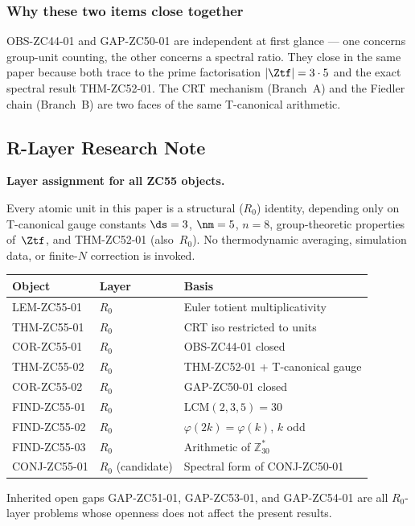 \documentclass[12pt, a4paper]{article}
\begin{document}
\subsubsection{Why these two items close together}

OBS-ZC44-01 and GAP-ZC50-01 are independent at first glance --- one
concerns group-unit counting, the other concerns a spectral ratio.
They close in the same paper because both trace to the prime
factorisation $|\Ztf|=3\cdot5$ and the exact spectral result
THM-ZC52-01.  The CRT mechanism (Branch~A) and the Fiedler chain
(Branch~B) are two faces of the same T-canonical arithmetic.

\subsection{R-Layer Research Note}

\begin{layerbox}
\textbf{Layer assignment for all ZC55 objects.}

Every atomic unit in this paper is a structural ($R_0$) identity,
depending only on T-canonical gauge constants $\ds=3$, $\nm=5$,
$n=8$, group-theoretic properties of~$\Ztf$, and THM-ZC52-01
(also~$R_0$).  No thermodynamic averaging, simulation data, or
finite-$N$ correction is invoked.

\begin{center}
\begin{tabular}{@{}lll@{}}
\toprule
\textbf{Object} & \textbf{Layer} & \textbf{Basis} \\
\midrule
LEM-ZC55-01 & $R_0$ & Euler totient multiplicativity \\
THM-ZC55-01 & $R_0$ & CRT iso restricted to units \\
COR-ZC55-01 & $R_0$ & OBS-ZC44-01 closed \\
THM-ZC55-02 & $R_0$ & THM-ZC52-01 + T-canonical gauge \\
COR-ZC55-02 & $R_0$ & GAP-ZC50-01 closed \\
FIND-ZC55-01 & $R_0$ & $\mathrm{LCM}(2,3,5)=30$ \\
FIND-ZC55-02 & $R_0$ & $\varphi(2k)=\varphi(k)$, $k$ odd \\
FIND-ZC55-03 & $R_0$ & Arithmetic of $\mathbb{Z}_{30}^*$ \\
CONJ-ZC55-01 & $R_0$ (candidate) & Spectral form of CONJ-ZC50-01 \\
\bottomrule
\end{tabular}
\end{center}

Inherited open gaps GAP-ZC51-01, GAP-ZC53-01, and GAP-ZC54-01 are
all $R_0$-layer problems whose openness does not affect the present
results.
\end{layerbox}
\end{document}
